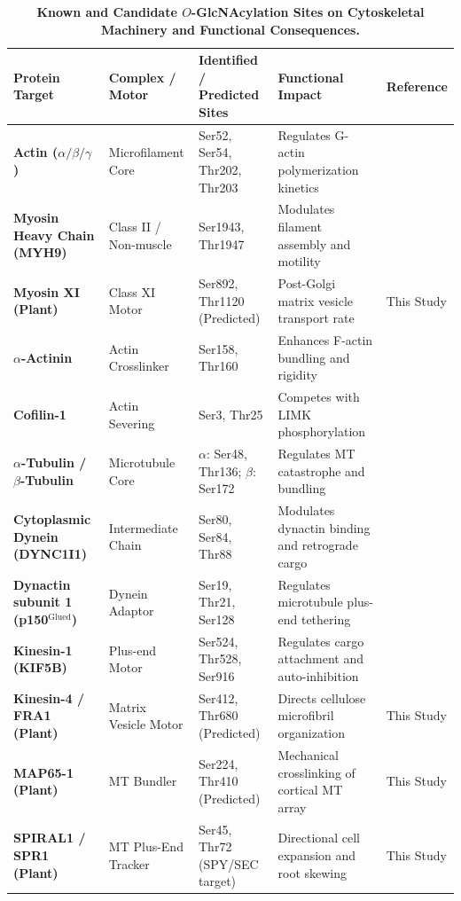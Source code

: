 \begin{table}[t]
\centering
\small
\caption{\textbf{Known and Candidate $O$-GlcNAcylation Sites on Cytoskeletal Machinery and Functional Consequences.}}
\label{tab:oglcnac_targets}
\begin{tabular}{lllll}
\hline
\textbf{Protein Target} & \textbf{Complex / Motor} & \textbf{Identified / Predicted Sites} & \textbf{Functional Impact} & \textbf{Reference} \\
\hline
\textbf{Actin ($\alpha/\beta/\gamma$)} & Microfilament Core & Ser52, Ser54, Thr202, Thr203 & Regulates G-actin polymerization kinetics & \cite{Wells2002, Tashima2006} \\
\textbf{Myosin Heavy Chain (MYH9)} & Class II / Non-muscle & Ser1943, Thr1947 & Modulates filament assembly and motility & \cite{Guo2014} \\
\textbf{Myosin XI (Plant)} & Class XI Motor & Ser892, Thr1120 (Predicted) & Post-Golgi matrix vesicle transport rate & This Study \\
\textbf{$\alpha$-Actinin} & Actin Crosslinker & Ser158, Thr160 & Enhances F-actin bundling and rigidity & \cite{Caldwell2010} \\
\textbf{Cofilin-1} & Actin Severing & Ser3, Thr25 & Competes with LIMK phosphorylation & \cite{Nagai2014} \\
\textbf{$\alpha$-Tubulin / $\beta$-Tubulin} & Microtubule Core & $\alpha$: Ser48, Thr136; $\beta$: Ser172 & Regulates MT catastrophe and bundling & \cite{Ji2011, Zeidan2010} \\
\textbf{Cytoplasmic Dynein (DYNC1I1)} & Intermediate Chain & Ser80, Ser84, Thr88 & Modulates dynactin binding and retrograde cargo & \cite{Trinidad2012, Reck-Peterson2018} \\
\textbf{Dynactin subunit 1 (p150$^{\text{Glued}}$)} & Dynein Adaptor & Ser19, Thr21, Ser128 & Regulates microtubule plus-end tethering & \cite{Trinidad2012} \\
\textbf{Kinesin-1 (KIF5B)} & Plus-end Motor & Ser524, Thr528, Ser916 & Regulates cargo attachment and auto-inhibition & \cite{Haltiwanger1992, Wells2002} \\
\textbf{Kinesin-4 / FRA1 (Plant)} & Matrix Vesicle Motor & Ser412, Thr680 (Predicted) & Directs cellulose microfibril organization & This Study \\
\textbf{MAP65-1 (Plant)} & MT Bundler & Ser224, Thr410 (Predicted) & Mechanical crosslinking of cortical MT array & This Study \\
\textbf{SPIRAL1 / SPR1 (Plant)} & MT Plus-End Tracker & Ser45, Thr72 (SPY/SEC target) & Directional cell expansion and root skewing & This Study \\
\hline
\end{tabular}
\end{table}

